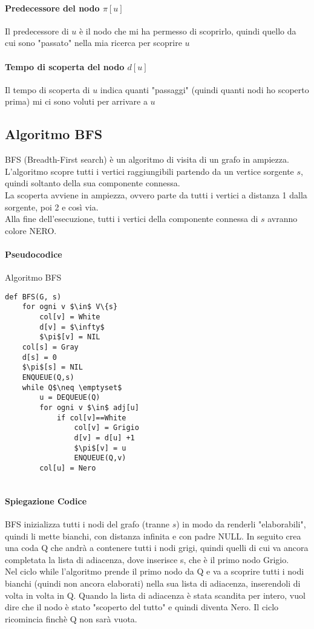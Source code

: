 \documentclass[12pt, a4paper, openany]{book}
\begin{document}
\paragraph{Predecessore del nodo $\pi[u]$}
Il predecessore di $u$ è il nodo che mi ha permesso di scoprirlo, quindi quello da cui sono "passato" nella mia ricerca per scoprire $u$
\paragraph{Tempo di scoperta del nodo $d[u]$}
Il tempo di scoperta di $u$ indica quanti "passaggi" (quindi quanti nodi ho scoperto prima) mi ci sono voluti per arrivare a $u$

\subsection{Algoritmo BFS}
BFS (Breadth-First search) è un algoritmo di visita di un grafo in ampiezza.
\\L'algoritmo scopre tutti i vertici raggiungibili partendo da un vertice sorgente $s$, quindi soltanto della sua componente connessa.
\\La scoperta avviene in ampiezza, ovvero parte da tutti i vertici a distanza 1 dalla sorgente, poi 2 e così via.
\\Alla fine dell'esecuzione, tutti i vertici della componente connessa di $s$ avranno colore NERO.

\paragraph{Pseudocodice} Algoritmo BFS
\begin{lstlisting}
def BFS(G, s)
    for ogni v $\in$ V\{s}
        col[v] = White
        d[v] = $\infty$
        $\pi$[v] = NIL
    col[s] = Gray
    d[s] = 0
    $\pi$[s] = NIL
    ENQUEUE(Q,s)
    while Q$\neq \emptyset$
        u = DEQUEUE(Q)
        for ogni v $\in$ adj[u]
            if col[v]==White
                col[v] = Grigio
                d[v] = d[u] +1
                $\pi$[v] = u
                ENQUEUE(Q,v)
        col[u] = Nero
    
\end{lstlisting}
\paragraph{Spiegazione Codice}
BFS inizializza tutti i nodi del grafo (tranne $s$) in modo da renderli "elaborabili", quindi li mette bianchi, con distanza infinita e con padre NULL.
In seguito crea una coda Q che andrà a contenere tutti i nodi grigi, quindi quelli di cui va ancora completata la lista di adiacenza,
dove inserisce s, che è il primo nodo Grigio.
\\Nel ciclo while l'algoritmo prende il primo nodo da Q e va a scoprire tutti i nodi bianchi (quindi non ancora elaborati) nella sua lista di adiacenza, inserendoli di volta in volta in Q.
Quando la lista di adiacenza è stata scandita per intero, vuol dire che il nodo è stato "scoperto del tutto" e quindi diventa Nero.
Il ciclo ricomincia finchè Q non sarà vuota.
\end{document}
